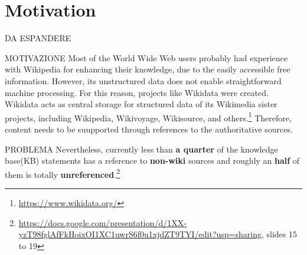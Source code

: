\chapter{Motivation}
\label{cha:1}
DA ESPANDERE

MOTIVAZIONE
Most of the World Wide Web users probably had experience with Wikipedia for enhancing their knowledge, due to the easily accessible free information. However, its unstructured data does not enable straightforward machine processing. For this reason, projects like Wikidata were created. Wikidata acts as central storage for structured data of its Wikimedia sister projects, including Wikipedia, Wikivoyage, Wikisource, and others.\footnote{\url{https://www.wikidata.org/}}
Therefore, content needs to be suupported through references to the authoritative sources. 

PROBLEMA
Nevertheless, currently less than \textbf{a quarter} of the knowledge base(KB) statements has a reference to \textbf{non-wiki} sources and roughly an \textbf{half} of them is totally \textbf{unreferenced}.\footnote{\url{https://docs.google.com/presentation/d/1XX-yzT98fglAfFkHoixOI1XC1uwrS6f0u1xjdZT9TYI/edit?usp=sharing}, slides 15 to 19}


